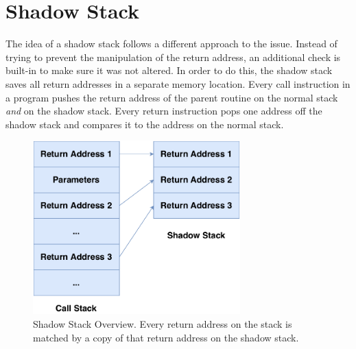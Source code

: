 \documentclass[10pt,twocolumn,a4paper]{article}
\begin{document}
\section{Shadow Stack}\label{shadowstack}
The idea of a shadow stack follows a different approach to the issue.
Instead of trying to prevent the manipulation of the return address, an additional check is built-in to make sure it was not altered.
In order to do this, the shadow stack saves all return addresses in a separate memory location.
Every call instruction in a program pushes the return address of the parent routine on the normal stack \emph{and} on the shadow stack.
Every return instruction pops one address off the shadow stack and compares it to the address on the normal stack.
\begin{figure}[h]
\includegraphics[keepaspectratio,width=8cm]{fig/ShadowStack}
\caption{Shadow Stack Overview. Every return address on the stack is matched by a copy of that return address on the shadow stack.}
\end{figure}
\end{document}
